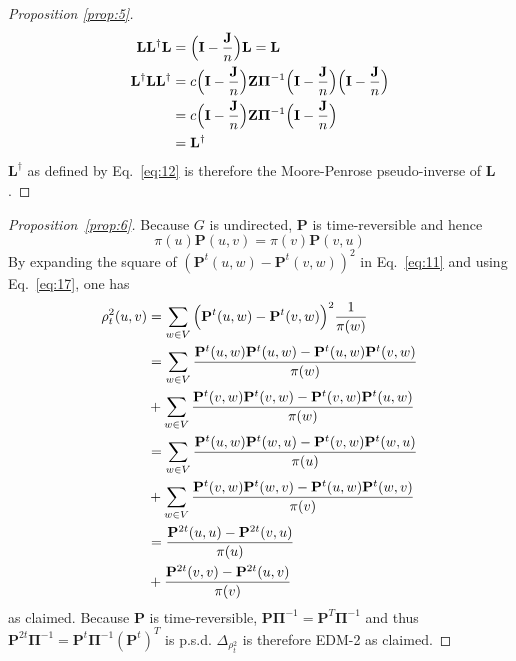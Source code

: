 \documentclass[10pt,twocolumn]{article}
\numberwithin{equation}{section}
\begin{document}
\begin{proof}[Proposition \ref{prop:5}]
\begin{align*}
    \mathbf{L}\mathbf{L}^{\dagger}\mathbf{L} & = \Bigl(\mathbf{I} -
    \frac{\mathbf{J}}{n}\Bigr) \mathbf{L} = \mathbf{L} \\
    \mathbf{L}^{\dagger}\mathbf{L}\mathbf{L}^{\dagger} &= c
    \Bigl(\mathbf{I} - \frac{\mathbf{J}}{n}\Bigr) \mathbf{Z}
    \bm{\Pi}^{-1} \Bigl(\mathbf{I} - \frac{\mathbf{J}}{n}\Bigr)
    \Bigl(\mathbf{I} - \frac{\mathbf{J}}{n}\Bigr) \\ &= c \Bigl(\mathbf{I}
    - \frac{\mathbf{J}}{n}\Bigr) \mathbf{Z} \bm{\Pi}^{-1}
    \Bigl(\mathbf{I} - \frac{\mathbf{J}}{n}\Bigr) \\ &=
    \mathbf{L}^{\dagger}
  \end{align*}
  $\mathbf{L}^{\dagger}$ as defined by Eq.~\eqref{eq:12} is therefore the
  Moore-Penrose pseudo-inverse of $\mathbf{L}$. 
\end{proof}
\begin{proof}[Proposition~\ref{prop:6}]
  Because $G$ is undirected, $\mathbf{P}$ is time-reversible and hence
  \begin{equation}
    \label{eq:17}
    \pi(u) \mathbf{P}(u,v) = \pi(v) \mathbf{P}(v,u) 
  \end{equation}
  By expanding the square of $(\mathbf{P}^{t}(u,w) -
  \mathbf{P}^{t}(v,w))^{2}$ in Eq.~\eqref{eq:11} and using
  Eq.~\eqref{eq:17}, one has
  \begin{equation*}
    \begin{split}
      \rho_{t}^{2}(u,v) &= \sum_{w \in V}{\Bigl(\mathbf{P}^{t}(u,w) -
        \mathbf{P}^{t}(v,w)\Bigr)^2 \frac{1}{\pi(w)}} \\
      &= \sum_{w \in V}{\frac{\mathbf{P}^{t}(u,w)\mathbf{P}^{t}(u,w) -
          \mathbf{P}^{t}(u,w)\mathbf{P}^{t}(v,w)}{\pi(w)}} \\
      &+\sum_{w \in V}{\frac{\mathbf{P}^{t}(v,w)\mathbf{P}^{t}(v,w) -
          \mathbf{P}^{t}(v,w)\mathbf{P}^{t}(u,w)}{\pi(w)}} \\
      &= \sum_{w \in
        V}{\frac{\mathbf{P}^{t}(u,w)\mathbf{P}^{t}(w,u) -
          \mathbf{P}^{t}(v,w)\mathbf{P}^{t}(w,u)}{\pi(u)}} \\ &+
      \sum_{w \in V}{\frac{\mathbf{P}^{t}(v,w)\mathbf{P}^{t}(w,v)
          -
          \mathbf{P}^{t}(u,w)\mathbf{P}^{t}(w,v)}{\pi(v)}} \\
      &= \frac{\mathbf{P}^{2t}(u,u) -
        \mathbf{P}^{2t}(v,u)}{\pi(u)} \\ &+
      \frac{\mathbf{P}^{2t}(v,v) -
        \mathbf{P}^{2t}(u,v)}{\pi(v)} 
    \end{split} 
  \end{equation*}
  as claimed. Because $\mathbf{P}$ is time-reversible,
  $\mathbf{P}\bm{\Pi}^{-1} = \mathbf{P}^{T}\bm{\Pi}^{-1}$ and thus
  $\mathbf{P}^{2t}\bm{\Pi}^{-1} =
  \mathbf{P}^{t}\bm{\Pi}^{-1}(\mathbf{P}^{t})^{T}$ is
  p.s.d. $\Delta_{\rho_{t}^{2}}$ is therefore EDM-2 as claimed.
\end{proof} 
\end{document}

